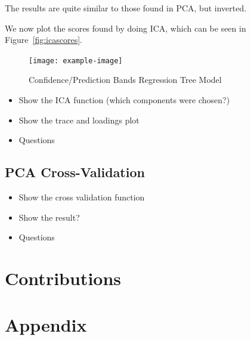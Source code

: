 \documentclass[a4paper, twocolumn]{article}
\begin{document}
        The results are quite similar to those found in PCA, but inverted.

        We now plot the scores found by doing ICA, which can be seen in Figure~\ref{fig:icascores}.

        \begin{figure}[h!]
            \centering
            \caption{Confidence/Prediction Bands Regression Tree Model}
            \label{fig:icascores.eps}
            \texttt{[image: example-image]}
        \end{figure}

        \begin{itemize}
            \item Show the ICA function (which components were chosen?)
            \item Show the trace and loadings plot
            \item Questions
        \end{itemize}

    \subsection*{PCA Cross-Validation}

        \begin{itemize}
            \item Show the cross validation function
            \item Show the result?
            \item Questions
        \end{itemize}

    \section*{Contributions}

    \nocite{*} %
    
    
    \onecolumn \appendix
    \section*{Appendix}

    
    
\end{document}
